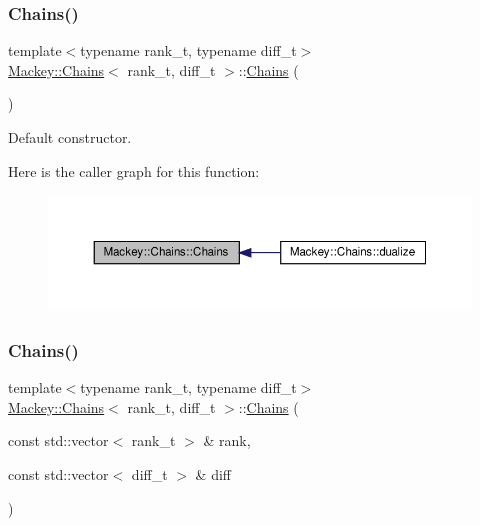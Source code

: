 \subsubsection{\texorpdfstring{Chains()}{Chains()}\hspace{0.1cm}{\footnotesize\ttfamily [1/2]}}
{\footnotesize\ttfamily template$<$typename rank\+\_\+t, typename diff\+\_\+t$>$ \\
\hyperlink{classMackey_1_1Chains}{Mackey\+::\+Chains}$<$ rank\+\_\+t, diff\+\_\+t $>$\+::\hyperlink{classMackey_1_1Chains}{Chains} (\begin{DoxyParamCaption}{ }\end{DoxyParamCaption})\hspace{0.3cm}{\ttfamily [inline]}}



Default constructor. 

Here is the caller graph for this function\+:\nopagebreak
\begin{figure}[H]
\begin{center}
\leavevmode
\includegraphics[width=350pt]{classMackey_1_1Chains_ade226a800be59b53f1f1850e0753dbcb_icgraph}
\end{center}
\end{figure}
\mbox{\label{classMackey_1_1Chains_a23e36ad0f810adeecad83b87b7034335}} 
\subsubsection{\texorpdfstring{Chains()}{Chains()}\hspace{0.1cm}{\footnotesize\ttfamily [2/2]}}
{\footnotesize\ttfamily template$<$typename rank\+\_\+t, typename diff\+\_\+t$>$ \\
\hyperlink{classMackey_1_1Chains}{Mackey\+::\+Chains}$<$ rank\+\_\+t, diff\+\_\+t $>$\+::\hyperlink{classMackey_1_1Chains}{Chains} (\begin{DoxyParamCaption}\item[{const std\+::vector$<$ rank\+\_\+t $>$ \&}]{rank,  }\item[{const std\+::vector$<$ diff\+\_\+t $>$ \&}]{diff }\end{DoxyParamCaption})\hspace{0.3cm}{\ttfamily [inline]}}



